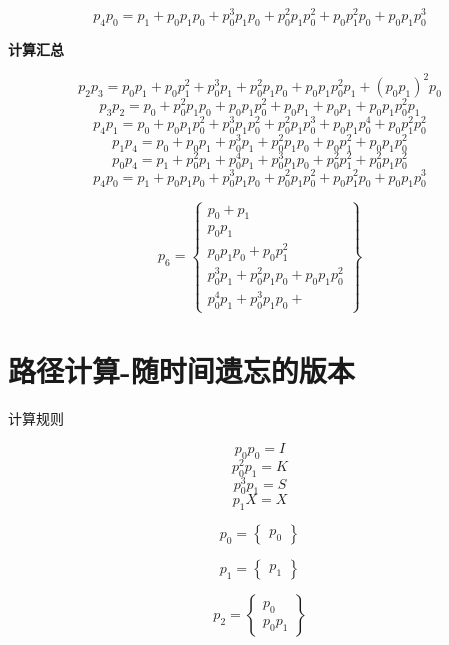 \documentclass[a4paper,12pt]{article}
\numberwithin{definition}{section}
\numberwithin{lemma}{section}
\numberwithin{proposition}{section}
\numberwithin{theorem}{section}
\numberwithin{grammar}{section}
\numberwithin{program}{section}
\numberwithin{convention}{section}
\numberwithin{corollary}{section}
\numberwithin{principle}{section}
\begin{document}
$$p_4 p_0 = p_1 + p_0 p_1 p_0 + p_0^3 p_1 p_0 + p_0^2 p_1 p_0^2 + p_0 p_1^2 p_0 + p_0 p_1 p_0^3$$

\textbf{计算汇总}

$$p_2 p_3 = p_0 p_1 + p_0 p_1^2 + p_0^3 p_1 + p_0^2 p_1 p_0 + p_0 p_1 p_0^2 p_1 + (p_0 p_1)^2 p_0$$
$$p_3 p_2 = p_0 + p_0^2 p_1 p_0 + p_0 p_1 p_0^2 + p_0 p_1 + p_0 p_1 + p_0 p_1 p_0^2 p_1 $$
$$p_4 p_1 = p_0 + p_0 p_1 p_0^2 + p_0^3 p_1 p_0^2 + p_0^2 p_1 p_0^3 + p_0 p_1 p_0^4 + p_0 p_1^2 p_0^2$$
$$p_1 p_4 = p_0 + p_0 p_1 + p_0^3 p_1 + p_0^2 p_1 p_0 + p_0 p_1^2 + p_0 p_1 p_0^2$$
$$p_0 p_4 = p_1 + p_0^2 p_1 + p_0^4 p_1 + p_0^3 p_1 p_0 + p_0^2 p_1^2 + p_0^2 p_1 p_0^2 $$
$$p_4 p_0 = p_1 + p_0 p_1 p_0 + p_0^3 p_1 p_0 + p_0^2 p_1 p_0^2 + p_0 p_1^2 p_0 + p_0 p_1 p_0^3$$

$$
p_6 = \begin{Bmatrix}
    p_0 + p_1 \\
    p_0 p_1 \\
    p_0 p_1 p_0 + p_0 p_1^2 \\
    p_0^3 p_1 + p_0^2 p_1 p_0 + p_0 p_1 p_0^2\\
    p_0^4 p_1 + p_0^3 p_1 p_0 +
\end{Bmatrix}
$$

\section{路径计算-随时间遗忘的版本}

计算规则

$$p_0 p_0 = I$$
$$p_0^2 p_1 = K$$
$$p_0^3 p_1 = S$$
$$p_1 X = X$$

$$p_0 = \begin{Bmatrix} p_0 \end{Bmatrix}$$

$$p_1 = \begin{Bmatrix} p_1 \end{Bmatrix}$$

$$p_2 = \begin{Bmatrix}  p_0 \\  p_0 p_1 \end{Bmatrix}$$
\end{document}
